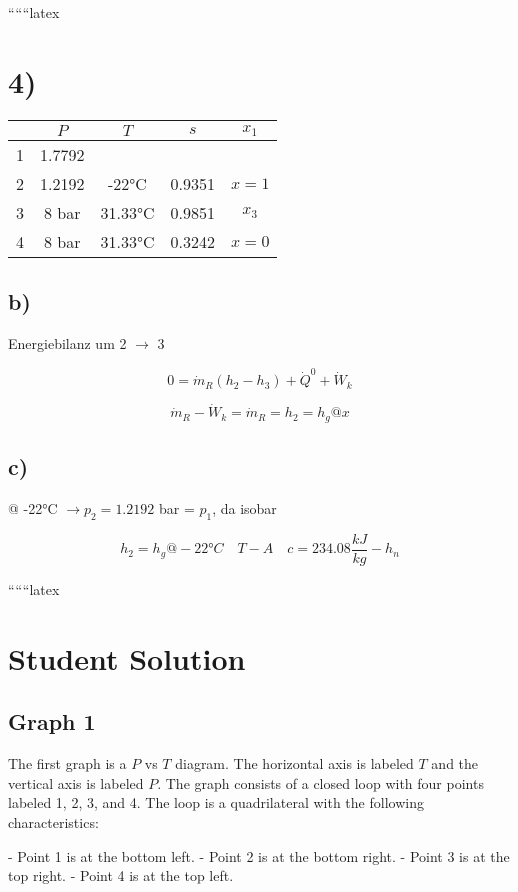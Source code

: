 
``````latex


\section*{4)}

\begin{tabular}{|c|c|c|c|c|}
\hline
 & $P$ & $T$ & $s$ & $x_1$ \\
\hline
1 & 1.7792 &  &  &  \\
\hline
2 & 1.2192 & -22°C & 0.9351 & $x=1$ \\
\hline
3 & 8 bar & 31.33°C & 0.9851 & $x_3$ \\
\hline
4 & 8 bar & 31.33°C & 0.3242 & $x=0$ \\
\hline
\end{tabular}

\subsection*{b)}
Energiebilanz um 2 $\rightarrow$ 3

\[
0 = \dot{m}_R (h_2 - h_3) + \dot{Q}^0 + \dot{W}_k
\]

\[
\dot{m}_R - \dot{W}_k = \dot{m}_R = h_2 = h_g @ x
\]

\subsection*{c)}
@ -22°C $\rightarrow p_2 = 1.2192$ bar = $p_1$, da isobar

\[
h_2 = h_g @ -22°C \quad T - A \quad c = 234.08 \frac{kJ}{kg} - h_n
\]

``````latex


\section*{Student Solution}

\subsection*{Graph 1}

The first graph is a $P$ vs $T$ diagram. The horizontal axis is labeled $T$ and the vertical axis is labeled $P$. The graph consists of a closed loop with four points labeled 1, 2, 3, and 4. The loop is a quadrilateral with the following characteristics:

- Point 1 is at the bottom left.
- Point 2 is at the bottom right.
- Point 3 is at the top right.
- Point 4 is at the top left.

